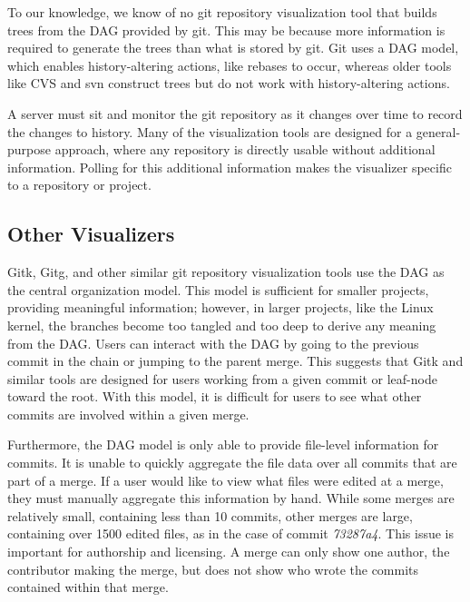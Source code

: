 \documentclass[conference, draftclsnofoot, draft]{IEEEtran}
\begin{document}
To our knowledge, we know of no git repository visualization tool that builds
trees from the DAG provided by git. This may be because more information is required
to generate the trees than what is stored by git. Git uses a DAG model, which
enables history-altering actions, like rebases to occur, whereas older tools like
CVS and svn construct trees\cite{CVS2008} but do not work with history-altering
actions.

A server must sit and monitor the git repository as it changes over time to record
the changes to history. Many of the visualization tools are designed for a
general-purpose approach, where any repository is directly usable without additional
information. Polling for this additional information makes the visualizer specific
to a repository or project.

\subsection{Other Visualizers}

Gitk, Gitg, and other similar git repository visualization tools use the DAG as the
central organization model. This model is sufficient for smaller projects, providing
meaningful information; however, in larger projects, like the Linux kernel, the
branches become too tangled and too deep to derive any meaning from the DAG. Users
can interact with the DAG by going to the previous commit in the chain or jumping to
the parent merge. This suggests that Gitk and similar tools are designed for users
working from a given commit or leaf-node toward the root. With this model, it is
difficult for users to see what other commits are involved within a given merge.

Furthermore, the DAG model is only able to provide file-level information for
commits. It is unable to quickly aggregate the file data over all commits that
are part of a merge. If a user would like to view what files were edited at a merge,
they must manually aggregate this information by hand. While some merges are
relatively small, containing less than 10 commits, other merges are large,
containing over 1500 edited files, as in the case of commit \textit{73287a4}. This
issue is important for authorship and licensing. A merge can only show one author,
the contributor making the merge, but does not show who wrote the commits contained
within that merge.


\end{document}
